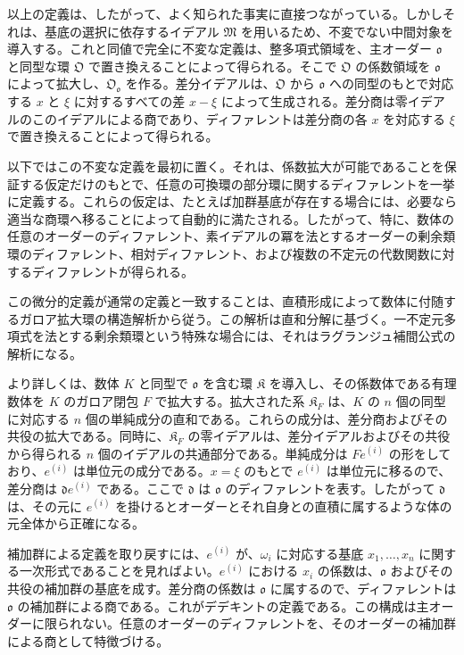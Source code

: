 以上の定義は、したがって、よく知られた事実に直接つながっている。しかしそれは、基底の選択に依存するイデアル \(\mathfrak M\) を用いるため、不変でない中間対象を導入する。これと同値で完全に不変な定義は、整多項式領域を、主オーダー \(\mathfrak o\) と同型な環 \(\mathfrak O\) で置き換えることによって得られる。そこで \(\mathfrak O\) の係数領域を \(\mathfrak o\) によって拡大し、\(\mathfrak O_{\mathfrak o}\) を作る。差分イデアルは、\(\mathfrak O\) から \(\mathfrak o\) への同型のもとで対応する \(x\) と \(\xi\) に対するすべての差 \(x-\xi\) によって生成される。差分商は零イデアルのこのイデアルによる商であり、ディファレントは差分商の各 \(x\) を対応する \(\xi\) で置き換えることによって得られる。

以下ではこの不変な定義を最初に置く。それは、係数拡大が可能であることを保証する仮定だけのもとで、任意の可換環の部分環に関するディファレントを一挙に定義する。これらの仮定は、たとえば加群基底が存在する場合には、必要なら適当な商環へ移ることによって自動的に満たされる。したがって、特に、数体の任意のオーダーのディファレント、素イデアルの冪を法とするオーダーの剰余類環のディファレント、相対ディファレント、および複数の不定元の代数関数に対するディファレントが得られる。

この微分的定義が通常の定義と一致することは、直積形成によって数体に付随するガロア拡大環の構造解析から従う。この解析は直和分解に基づく。一不定元多項式を法とする剰余類環という特殊な場合には、それはラグランジュ補間公式の解析になる。

より詳しくは、数体 \(K\) と同型で \(\mathfrak o\) を含む環 \(\mathfrak K\) を導入し、その係数体である有理数体を \(K\) のガロア閉包 \(F\) で拡大する。拡大された系 \(\mathfrak K_F\) は、\(K\) の \(n\) 個の同型に対応する \(n\) 個の単純成分の直和である。これらの成分は、差分商およびその共役の拡大である。同時に、\(\mathfrak K_F\) の零イデアルは、差分イデアルおよびその共役から得られる \(n\) 個のイデアルの共通部分である。単純成分は \(Fe^{(i)}\) の形をしており、\(e^{(i)}\) は単位元の成分である。\(x=\xi\) のもとで \(e^{(i)}\) は単位元に移るので、差分商は \(\mathfrak d e^{(i)}\) である。ここで \(\mathfrak d\) は \(\mathfrak o\) のディファレントを表す。したがって \(\mathfrak d\) は、その元に \(e^{(i)}\) を掛けるとオーダーとそれ自身との直積に属するような体の元全体から正確になる。

補加群による定義を取り戻すには、\(e^{(i)}\) が、\(\omega_i\) に対応する基底 \(x_1,\ldots,x_n\) に関する一次形式であることを見ればよい。\(e^{(i)}\) における \(x_i\) の係数は、\(\mathfrak o\) およびその共役の補加群の基底を成す。差分商の係数は \(\mathfrak o\) に属するので、ディファレントは \(\mathfrak o\) の補加群による商である。これがデデキントの定義である。この構成は主オーダーに限られない。任意のオーダーのディファレントを、そのオーダーの補加群による商として特徴づける。

